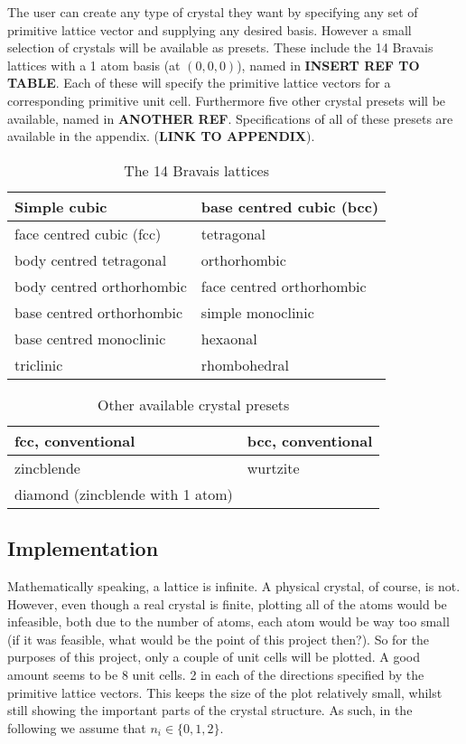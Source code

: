 \documentclass[main.tex]{subfiles}
\begin{document}
	The user can create any type of crystal they want by specifying any set of primitive lattice vector and supplying any desired basis. However a small selection of crystals will be available as presets. These include the 14 Bravais lattices with a 1 atom basis (at $ (0,0,0) $), named in \textbf{INSERT REF TO TABLE}. Each of these will specify the primitive lattice vectors for a corresponding primitive unit cell. Furthermore five other crystal presets will be available, named in \textbf{ANOTHER REF}. Specifications of all of these presets are available in the appendix. (\textbf{LINK TO APPENDIX}).
	\begin{table}
		\centering
		\begin{tabular}{|l|l|}
			\hline
			Simple cubic & base centred cubic (bcc) \\
			\hline
			face centred cubic (fcc) & tetragonal \\
			\hline
			body centred tetragonal & orthorhombic \\
			\hline
			body centred orthorhombic & face centred orthorhombic \\
			\hline
			base centred orthorhombic & simple monoclinic \\
			\hline
			base centred monoclinic & hexaonal \\
			\hline
			triclinic & rhombohedral \\
			\hline
		\end{tabular}
		\caption{The 14 Bravais lattices}
		\label{tab:bravais}
	\end{table}
	\begin{table}
		\centering
		\begin{tabular}{|l|l|}
			\hline
			fcc, conventional & bcc, conventional \\
			\hline
			zincblende & wurtzite \\
			\hline
			diamond (zincblende with 1 atom) & \\
			\hline
		\end{tabular}
		\caption{Other available crystal presets}
		\label{tab:presets}
	\end{table}
	
	\subsection{Implementation}
	Mathematically speaking, a lattice is infinite. A physical crystal, of course, is not. However, even though a real crystal is finite, plotting all of the atoms would be infeasible, both due to the number of atoms, each atom would be way too small (if it was feasible, what would be the point of this project then?). So for the purposes of this project, only a couple of unit cells will be plotted. A good amount seems to be 8 unit cells. 2 in each of the directions specified by the primitive lattice vectors. This keeps the size of the plot relatively small, whilst still showing the important parts of the crystal structure. As such, in the following we assume that $ n_i \in \{0, 1, 2\} $.
	
\end{document}
